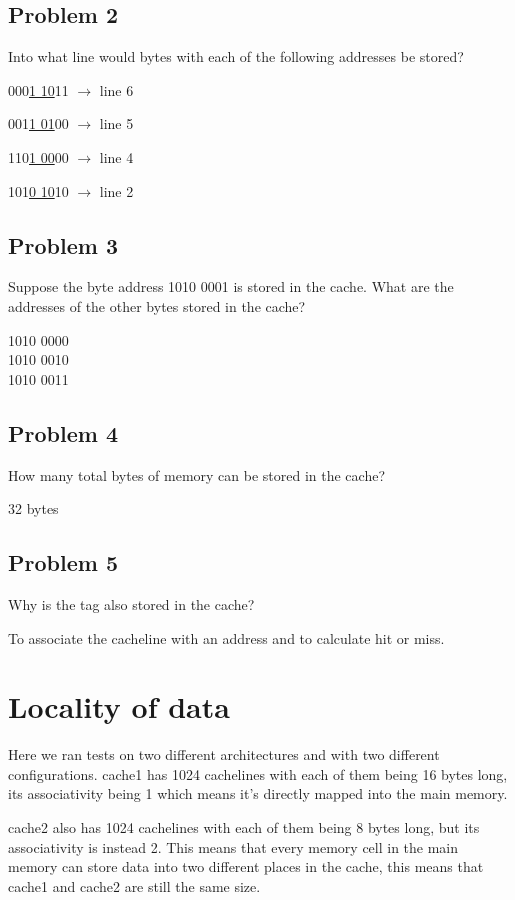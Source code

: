 \documentclass[titlepage, a4paper]{article}
\begin{document}
\subsection{Problem 2}
Into what line would bytes with each of the following addresses be stored?

000\underline{1 10}11 $\to$ line 6

001\underline{1 01}00 $\to$ line 5

110\underline{1 00}00 $\to$ line 4

101\underline{0 10}10 $\to$ line 2

\subsection{Problem 3}
Suppose the byte address 1010 0001 is stored in the cache. What are the addresses of the other bytes stored in the cache?

1010 0000 \\
1010 0010 \\
1010 0011 \\

\subsection{Problem 4}
How many total bytes of memory can be stored in the cache?

32 bytes

\subsection{Problem 5}
Why is the tag also stored in the cache?

To associate the cacheline with an address and to calculate hit or miss.

\section{Locality of data}
Here we ran tests on two different architectures and with two different configurations.
cache1 has 1024 cachelines with each of them being 16 bytes long, its associativity being 1 which means it's directly mapped into the main memory.

cache2 also has 1024 cachelines with each of them being 8 bytes long, but its associativity is instead 2. This means that every memory cell in the main memory can store data into two different places in the cache, this means that cache1 and cache2 are still the same size.
\end{document}
